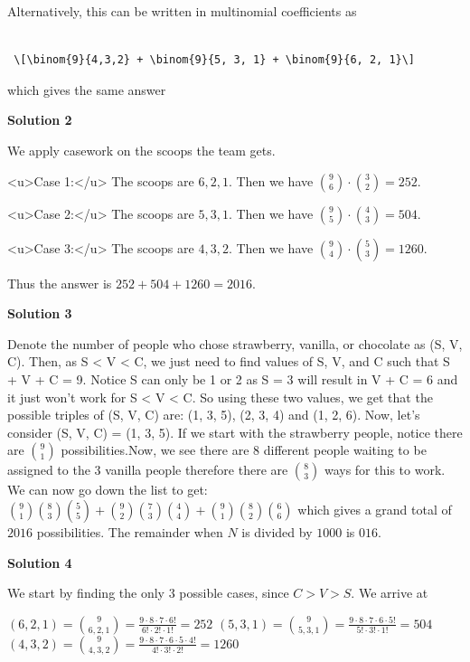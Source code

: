 \begin{enumerate}
 Alternatively, this can be written in multinomial coefficients as 

 \begin{verbatim}

 \[\binom{9}{4,3,2} + \binom{9}{5, 3, 1} + \binom{9}{6, 2, 1}\] 
\end{verbatim}

which gives the same answer

 



\textbf{Solution 2}

We apply casework on the scoops the team gets.

 <u>Case 1:</u> The scoops are $6,2,1$. Then we have $\binom{9}{6}\cdot \binom{3}{2} = 252$.

 <u>Case 2:</u> The scoops are $5,3,1$. Then we have $\binom{9}{5}\cdot \binom{4}{3} = 504$.

 <u>Case 3:</u> The scoops are $4,3,2$. Then we have $\binom{9}{4}\cdot \binom{5}{3} = 1260$.

 Thus the answer is $252+504+1260=2\boxed{016}$.

 



\textbf{Solution 3}

Denote the number of people who chose strawberry, vanilla, or chocolate as (S, V, C). Then, as S < V < C, we just need to find values of S, V, and C such that S + V + C = 9. Notice S can only be 1 or 2 as S = 3 will result in V + C = 6 and it just won't work for S < V < C. So using these two values, we get that the possible triples of (S, V, C) are: (1, 3, 5), (2, 3, 4) and (1, 2, 6). Now, let's consider (S, V, C) = (1, 3, 5). If we start with the strawberry people, notice there are ${9\choose 1}$ possibilities.Now, we see there are 8 different people waiting to be assigned to the 3 vanilla people therefore there are ${8\choose 3}$ ways for this to work. We can now go down the list to get:${9\choose 1}{8\choose 3}{5\choose 5} + {9\choose 2}{7\choose 3}{4\choose 4} + {9\choose 1}{8\choose 2}{6\choose 6}$ which gives a grand total of $2016$ possibilities. The remainder when $N$ is divided by $1000$ is $\boxed{016}$.

 



\textbf{Solution 4}

We start by finding the only 3 possible cases, since $C>V>S$. We arrive at

 $(6, 2, 1) = {9 \choose 6,2,1} = \frac{9 \cdot 8 \cdot 7 \cdot 6!}{6! \cdot 2! \cdot 1!} = 252$
$(5, 3, 1) = {9 \choose 5,3,1} = \frac{9 \cdot 8 \cdot 7 \cdot 6 \cdot 5!}{5! \cdot 3! \cdot 1!} = 504$
$(4, 3, 2) = {9 \choose 4,3,2} = \frac{9 \cdot 8 \cdot 7 \cdot 6 \cdot 5 \cdot 4!}{4! \cdot 3! \cdot 2!} = 1260$


\end{enumerate}

